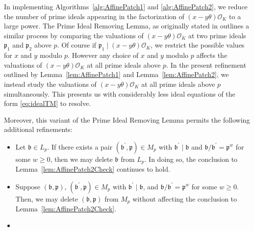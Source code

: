 In implementing Algorithms~\ref{alg:AffinePatch1} and \ref{alg:AffinePatch2}, we reduce the number of prime ideals appearing in the factorization of $(x-y\theta)\mathcal{O}_K$ to a large power. The Prime Ideal Removing Lemma, as originally stated in  outlines a similar process by comparing the valuations of $(x-y\theta)\mathcal{O}_K$ at two prime ideals $\mathfrak{p}_1$ and $\mathfrak{p}_2$ above $p$. Of course if $\mathfrak{p}_1 \mid (x-y\theta)\mathcal{O}_K$, we restrict the possible values for $x$ and $y$ modulo $p$. However any choice of $x$ and $y$ modulo $p$ affects the valuations of $(x-y\theta)\mathcal{O}_K$ at all prime ideals above $p$. In the present refinement outlined by Lemma~\ref{lem:AffinePatch1} and Lemma~\ref{lem:AffinePatch2}, we instead study the valuations of $(x-y\theta)\mathcal{O}_K$ at all prime ideals above $p$ simultaneously. This presents us with considerably less ideal equations of the form \ref{eq:idealTM} to resolve. 

Moreover, this variant of the Prime Ideal Removing Lemma permits the following additional refinements:
\begin{itemize}
\item Let $\mathfrak{b} \in L_p$. If there exists a pair $(\mathfrak{b}^\prime,\mathfrak{p}) \in M_p$ with $\mathfrak{b}^\prime \mid \mathfrak{b}$ and $\mathfrak{b}/\mathfrak{b}^\prime=\mathfrak{p}^w$
for some $w \ge 0$, then we may delete $\mathfrak{b}$ from $L_p$. In doing so, the conclusion to Lemma~\ref{lem:AffinePatch2Check} continues to hold.
\item Suppose $(\mathfrak{b},\mathfrak{p})$, $(\mathfrak{b}^\prime,\mathfrak{p}) \in M_p$ with $\mathfrak{b}^{\prime} \mid \mathfrak{b}$, and $\mathfrak{b}/\mathfrak{b}^{\prime}=\mathfrak{p}^w$ for some ${w \geq 0}$. Then, we may delete $(\mathfrak{b},\mathfrak{p})$ from $M_p$ without affecting the conclusion to Lemma~\ref{lem:AffinePatch2Check}. 
\item {}
\end{itemize}



